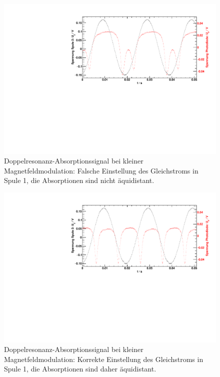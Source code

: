 \begin{figure}[H]
\begin{center}
    \includegraphics[width=\textwidth]{../img/part3/11.pdf}
    \caption{Doppelresonanz-Absorptionssignal bei kleiner Magnetfeldmodulation:
    Falsche Einstellung des Gleichstroms in Spule 1,
    die Absorptionen sind nicht äquidistant.}
    \label{img:rfwrong}
\end{center}
\end{figure}

\begin{figure}[H]
\begin{center}
    \includegraphics[width=\textwidth]{../img/part3/08.pdf}
    \caption{Doppelresonanz-Absorptionssignal bei kleiner Magnetfeldmodulation:
    Korrekte Einstellung des Gleichstroms in Spule 1,
    die Absorptionen sind daher äquidistant.}
    \label{img:rfcorrect}
\end{center}
\end{figure}

